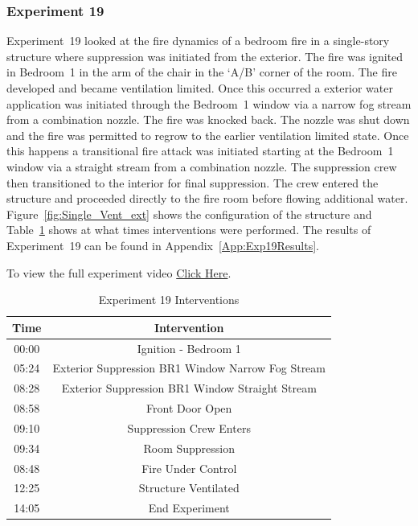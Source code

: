 \documentclass[12pt,oneside]{book}
\begin{document}
\FloatBarrier
\clearpage

\subsubsection{Experiment 19}
Experiment~19 looked at the fire dynamics of a bedroom fire in a single-story structure where suppression was initiated from the exterior. The fire was ignited in Bedroom~1 in the arm of the chair in the `A/B' corner of the room. The fire developed and became ventilation limited. Once this occurred a exterior water application was initiated through the Bedroom~1 window via a narrow fog stream from a combination nozzle. The fire was knocked back. The nozzle was shut down and the fire was permitted to regrow to the earlier ventilation limited state.  Once this happens a transitional fire attack was initiated starting at the Bedroom~1 window via a straight stream from a combination nozzle. The suppression crew then transitioned to the interior for final suppression. The crew entered the structure and proceeded directly to the fire room before flowing additional water. Figure~\ref{fig:Single_Vent_ext} shows the configuration of the structure and Table~\ref{Table:Exp19Interventions} shows at what times interventions were performed. The results of Experiment~19 can be found in Appendix~\ref{App:Exp19Results}. 

To view the full experiment video \href{https://player.vimeo.com/video/170499621?autoplay=1}{Click Here}.

\begin{table}[H]
	\centering
	\caption{Experiment 19 Interventions}
	\begin{tabular}{|c|c|} 
		\hline
		Time & Intervention \\ \hline \hline
		00:00 & Ignition - Bedroom 1 \\ \hline
		05:24 & Exterior Suppression BR1 Window Narrow Fog Stream \\ \hline
		08:28 & Exterior Suppression BR1 Window Straight Stream \\ \hline
		08:58 & Front Door Open \\ \hline
		09:10 & Suppression Crew Enters\\ \hline
		09:34 & Room Suppression \\ \hline 
		08:48 & Fire Under Control 	\\ \hline
		12:25 & Structure Ventilated \\ \hline
		14:05 & End Experiment\\ \hline
	\end{tabular}
	\label{Table:Exp19Interventions}
\end{table}
\end{document}
